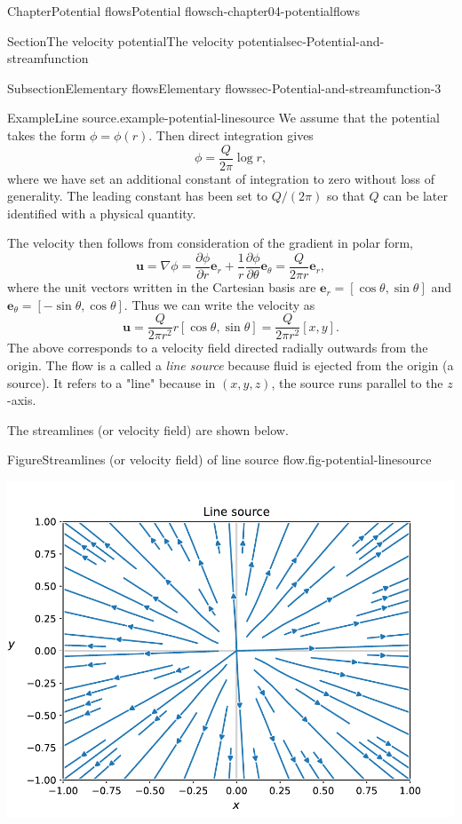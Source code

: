 \documentclass[oneside,10pt,]{book}
\numberwithin{equation}{section}
\newcommand{\pd}[2]{\frac{\partial#1}{\partial#2}}
\newcommand{\be}{\boldsymbol{e}}
\newcommand{\bu}{\boldsymbol{u}}
\begin{document}
\begin{chapterptx}{Chapter}{Potential flows}{}{Potential flows}{}{}{ch-chapter04-potentialflows}
\begin{sectionptx}{Section}{The velocity potential}{}{The velocity potential}{}{}{sec-Potential-and-streamfunction}
\begin{subsectionptx}{Subsection}{Elementary flows}{}{Elementary flows}{}{}{sec-Potential-and-streamfunction-3}
\begin{example}{Example}{Line source.}{example-potential-linesource}
We assume that the potential takes the form \(\phi = \phi(r)\). Then direct integration gives%
\begin{equation*}
\phi = \frac{Q}{2\pi} \log r, 
\end{equation*}
where we have set an additional constant of integration to zero without loss of generality. The leading constant has been set to \(Q/(2\pi)\) so that \(Q\) can be later identified with a physical quantity.%
\par
The velocity then follows from consideration of the gradient in polar form,%
\begin{equation*}
\bu = \nabla \phi = \pd{\phi}{r} \be_r + \frac{1}{r}\pd{\phi}{\theta} \be_{\theta} = \frac{Q}{2\pi r} \be_r,
\end{equation*}
where the unit vectors written in the Cartesian basis are \(\be_r = [\cos\theta, \sin\theta]\) and \(\be_{\theta} = [-\sin\theta, \cos\theta]\). Thus we can write the velocity as%
\begin{equation*}
\bu = \frac{Q}{2\pi r^2} r[\cos\theta, \sin\theta] = \frac{Q}{2\pi r^2} [x, y].
\end{equation*}
The above corresponds to a velocity field directed radially outwards from the origin. The flow is a called a \emph{line source} because fluid is ejected from the origin (a source). It refers to a "line" because in \((x, y, z)\), the source runs parallel to the \(z\)-axis.%
\par
The streamlines (or velocity field) are shown below.%
\begin{figureptx}{Figure}{Streamlines (or velocity field) of line source flow.}{fig-potential-linesource}{}%
\begin{image}{0.05}{0.9}{0.05}{}%
\includegraphics[width=\linewidth]{external/linesource.pdf}

\end{image}
\end{figureptx}
\end{example}
\end{subsectionptx}
\end{sectionptx}
\end{chapterptx}
\end{document}
